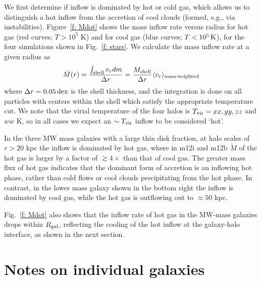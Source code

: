\documentclass[fleqn,usenatbib]{mnras}
\newcommand{\Mdot}{\dot{M}}
\newcommand{\Tvir}{T_{\rm vir}}
\begin{document}
We first determine if inflow is dominated by hot or cold gas, which allows us to distinguish a hot inflow from the accretion of cool clouds (formed, e.g., via instabilities).
Figure~\ref{f: Mdot} shows the mass inflow rate versus radius for hot gas (red curves; $T>10^5$ K) and for cool gas (blue curves; $T < 10^5\,{\rm K}$),  for the four simulations shown in Fig.~\ref{f: stars}. 
We calculate the mass inflow rate at a given radius as
\begin{equation}
     \Mdot(r) = \frac{\int_{\rm shell} v_r dm}{\Delta r} = \frac{M_{\rm shell}}{\Delta r} \langle v_r\rangle_{\rm mass\, weighted}
     \label{e: Mdot}
\end{equation}
where $\Delta r=0.05\,{\rm dex}$ is the shell thickness, and the integration is done on all particles with centers within the shell which satisfy the appropriate temperature cut.  We note that the virial temperature of the four halos is $\Tvir = xx, yy, zz$ and $ww$ K, so in all cases we expect an $\sim\Tvir$ inflow  to be considered `hot'. 

In the three MW mass galaxies with a large thin disk fraction, at halo scales of $r>20$ kpc the inflow is dominated by hot gas, where in m12i and m12b $\Mdot$ of the hot gas is larger by a factor of $\gtrsim 4\times$ than that of cool gas. The greater mass flux of hot gas indicates that the dominant form of accretion is an inflowing hot phase, rather than cold flows or cool clouds precipitating from the hot phase.
In contrast, in the lower mass galaxy shown in the bottom right the inflow is dominated by cool gas, while the hot gas is outflowing out to $\approx50$ kpc.

Fig.~\ref{f: Mdot} also shows that the inflow rate of hot gas in the MW-mass galaxies drops within $R_{\rm gal}$, reflecting the cooling of the hot inflow at the galaxy-halo interface, as shown in the next section.

\section{Notes on individual galaxies}

\label{s: appendix-individual}
\end{document}

